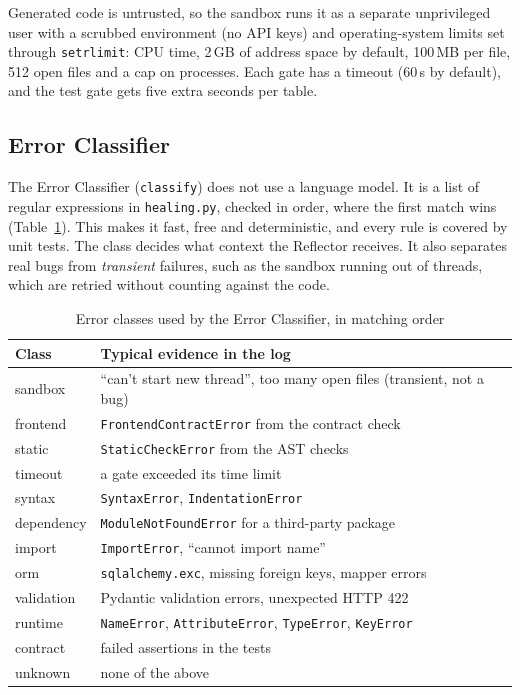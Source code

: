 \documentclass[12pt,a4paper]{report}
\begin{document}
Generated code is untrusted, so the sandbox runs it as a separate unprivileged user with a scrubbed environment (no API keys) and operating-system limits set through \texttt{setrlimit}: CPU time, 2\,GB of address space by default, 100\,MB per file, 512 open files and a cap on processes. Each gate has a timeout (60\,s by default), and the test gate gets five extra seconds per table.

\subsection{Error Classifier}

The Error Classifier (\texttt{classify}) does not use a language model. It is a list of regular expressions in \texttt{healing.py}, checked in order, where the first match wins (Table~\ref{tab:errors}). This makes it fast, free and deterministic, and every rule is covered by unit tests. The class decides what context the Reflector receives. It also separates real bugs from \emph{transient} failures, such as the sandbox running out of threads, which are retried without counting against the code.

\begin{table}[!ht]
    \centering
    \renewcommand{\arraystretch}{1.3}
    \caption{Error classes used by the Error Classifier, in matching order}
    \label{tab:errors}
    \begin{tabular}{|l|p{9cm}|}
    \hline
    \textbf{Class} & \textbf{Typical evidence in the log} \\\hline
    sandbox & ``can't start new thread'', too many open files (transient, not a bug) \\\hline
    frontend & \texttt{FrontendContractError} from the contract check \\\hline
    static & \texttt{StaticCheckError} from the AST checks \\\hline
    timeout & a gate exceeded its time limit \\\hline
    syntax & \texttt{SyntaxError}, \texttt{IndentationError} \\\hline
    dependency & \texttt{ModuleNotFoundError} for a third-party package \\\hline
    import & \texttt{ImportError}, ``cannot import name'' \\\hline
    orm & \texttt{sqlalchemy.exc}, missing foreign keys, mapper errors \\\hline
    validation & Pydantic validation errors, unexpected HTTP 422 \\\hline
    runtime & \texttt{NameError}, \texttt{AttributeError}, \texttt{TypeError}, \texttt{KeyError} \\\hline
    contract & failed assertions in the tests \\\hline
    unknown & none of the above \\\hline
    \end{tabular}
\end{table}
\end{document}
